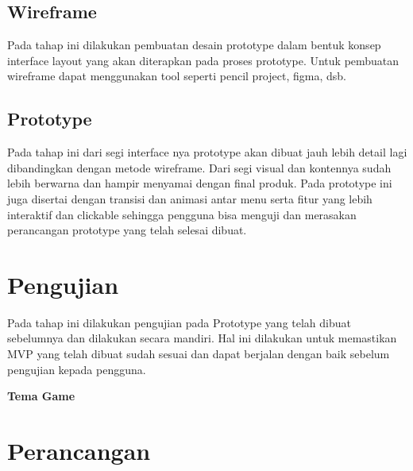 \subsection{Wireframe}
\begin{subsectioncontent}
    \hspace{\parindent}Pada tahap ini dilakukan pembuatan desain prototype dalam bentuk konsep interface layout yang akan diterapkan pada proses prototype. Untuk pembuatan wireframe dapat menggunakan tool seperti pencil project, figma, dsb.
\end{subsectioncontent}

\subsection{Prototype}
\begin{subsectioncontent}
    \hspace{\parindent}Pada tahap ini dari segi interface nya prototype akan dibuat jauh lebih detail lagi dibandingkan dengan metode wireframe. Dari segi visual dan kontennya sudah lebih berwarna dan hampir menyamai dengan final produk. Pada prototype ini juga disertai dengan transisi dan animasi antar menu serta fitur yang lebih interaktif dan clickable sehingga pengguna bisa menguji dan merasakan perancangan prototype yang telah selesai dibuat.
\end{subsectioncontent}

\section{Pengujian}
\begin{sectioncontent}
    \hspace{\parindent}Pada tahap ini dilakukan pengujian pada Prototype yang telah dibuat sebelumnya dan dilakukan secara mandiri. Hal ini dilakukan untuk memastikan MVP yang telah dibuat sudah sesuai dan dapat berjalan dengan baik sebelum pengujian kepada pengguna.
\end{sectioncontent}

\textbf{Tema Game}

\setcounter{section}{0} %
\setcounter{subsection}{0} %

\section{Perancangan}

